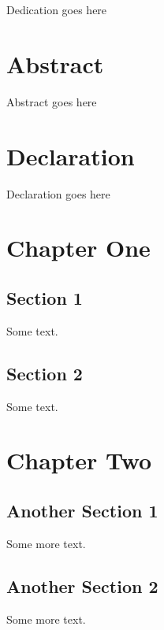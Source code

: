 \documentclass[a4paper,twoside,12pt]{book}
\begin{document}
\dominitoc
\chapter*{ } %
\mtcaddchapter           %
Dedication goes here

\chapter*{Abstract}
\mtcaddchapter[Abstract] %
Abstract goes here

\chapter*{Declaration}
\mtcaddchapter[Declaration] %
Declaration goes here
\tableofcontents \decrementmtc %
\chapter{Chapter One}
\minitoc
\section{Section 1} Some text.
\section{Section 2} Some text.

\chapter{Chapter Two}
\minitoc
\section{Another Section 1}
Some more text.
\section{Another Section 2}
Some more text.
\end{document}
